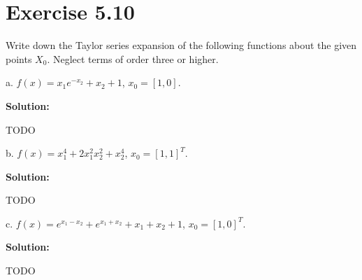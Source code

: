 \documentclass{article}
\begin{document}
\section*{Exercise 5.10}
Write down the Taylor series expansion of the following functions about the
given points $X_0$. Neglect terms of order three or higher.

a. $f(x)=x_1e^{-x_2}+x_2+1$, $x_0=[1,0]$.

\textbf{Solution:}

TODO

b. $f(x)=x_1^4+2x_1^2x_2^2 +x_2^4$, $x_0=[1,1]^T$.

\textbf{Solution:}

TODO

c. $f(x)=e^{x_1-x_2}+e^{x_1+x_2}+x_1+x_2+1$, $x_0=[1,0]^T$.

\textbf{Solution:}

TODO
\end{document}
